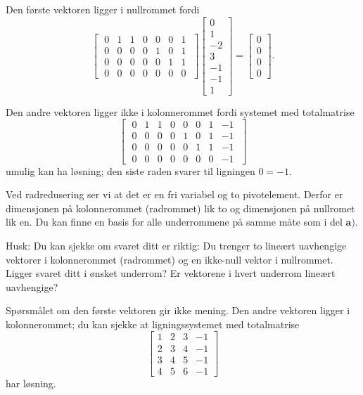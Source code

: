 \begin{losning}
\begin{punkt}
Den første vektoren ligger i nullrommet fordi 
$$\begin{bmatrix}
\;0 & 1 & 1 & 0 & 0 & 0 & 1\;\\
\;0 & 0 & 0 & 0 & 1 & 0 & 1\;\\
\;0 & 0 & 0 & 0 & 0 & 1 & 1\;\\
\;0 & 0 & 0 & 0 & 0 & 0 & 0\;
\end{bmatrix}
\begin{bmatrix}
0\\
1\\
-2\\
3\\
-1\\
-1\\
1
\end{bmatrix}=
\begin{bmatrix}
0\\
0\\
0\\
0
\end{bmatrix}.
 $$
 
Den andre vektoren ligger ikke i kolonnerommet fordi systemet med totalmatrise 
$$
\begin{bmatrix}
\;0 & 1 & 1 & 0 & 0 & 0 & 1 & -1 \;\\
\;0 & 0 & 0 & 0 & 1 & 0 & 1 & -1 \;\\
\;0 & 0 & 0 & 0 & 0 & 1 & 1 & -1 \;\\
\;0 & 0 & 0 & 0 & 0 & 0 & 0 & -1 \;
\end{bmatrix}
$$
umulig kan ha løsning; den siste raden svarer til ligningen $0=-1$.
\end{punkt}

\begin{punkt}

Ved radredusering ser vi at det er en fri variabel og to pivotelement. Derfor er dimensjonen på kolonnerommet (radrommet) lik to og dimensjonen på nullromet lik en. Du kan finne en basis for alle underrommene på samme måte som i del $\textbf{a)}$.

\noindent
Husk: Du kan sjekke om svaret ditt er riktig: Du trenger to lineært uavhengige vektorer i kolonnerommet (radrommet) og en ikke-null vektor i nullrommet. Ligger svaret ditt i ønsket underrom? Er vektorene i hvert underrom lineært uavhengige?

Spørsmålet om den første vektoren gir ikke mening. Den andre vektoren ligger i kolonnerommet; du kan sjekke at ligningssystemet med totalmatrise 
$$
\begin{bmatrix}
	1 & 2 & 3 & -1\\
	2 & 3 & 4 & -1\\
	3 & 4 & 5 & -1\\
	4 & 5 & 6 & -1
	\end{bmatrix}
$$ har løsning.

\end{punkt}

\end{losning}


